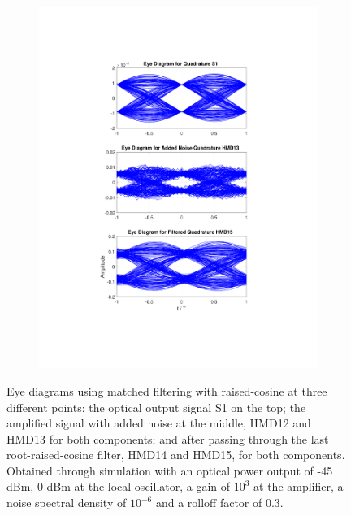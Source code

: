 \begin{figure}[H]
\begin{subfigure}{.45\textwidth}
		\includegraphics[clip, trim=5cm 4cm 5cm 4cm, width=\textwidth]{./sdf/m_qam_system/figures/eyes/q_n_p_45_03_rc.pdf}
	\end{subfigure}
	
	\caption{Eye diagrams using matched filtering with raised-cosine at three different points: the optical output signal S1 on the top; the amplified signal with added noise at the middle, HMD12 and HMD13 for both components; and after passing through the last root-raised-cosine filter, HMD14 and HMD15, for both components. Obtained through simulation with an optical power output of -45 dBm, 0 dBm at the local oscillator, a gain of $10^3$ at the amplifier, a noise spectral density of $10^{-6}$ and a rolloff factor of 0.3.\label{fig:eyes_n_rc_45_03}}
\end{figure}

